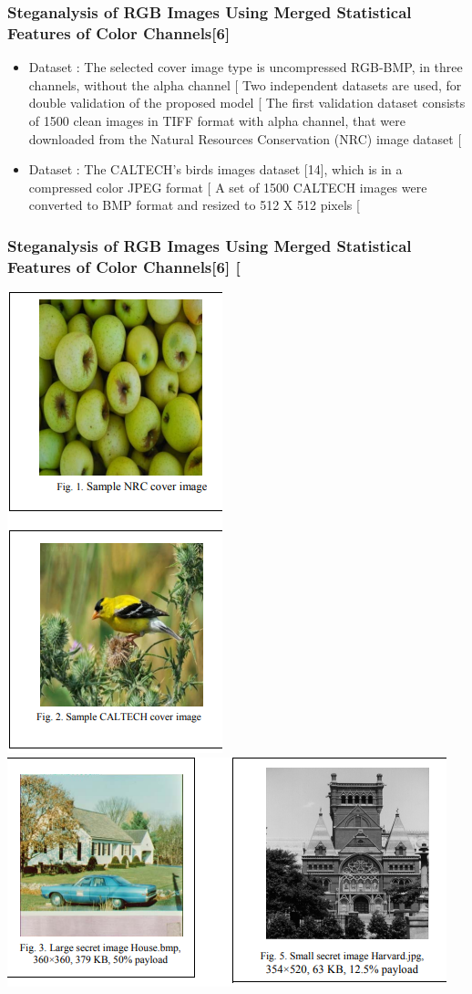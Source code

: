 \documentclass{beamer} %
\theoremstyle{definition} %
\begin{document}
\begin{frame}
\frametitle{Steganalysis of RGB Images Using Merged Statistical Features of Color Channels[6]  }
\begin{itemize}
	\item Dataset :  The selected cover image type is uncompressed RGB-BMP, in three channels, without the alpha channel [  Two independent datasets are used, for double validation of the proposed model [  The first validation dataset consists of 1500 clean images in TIFF format with alpha channel, that were downloaded from the Natural Resources Conservation (NRC) image dataset [ 
	\item Dataset : The CALTECH’s birds images dataset [14], which is in a compressed color JPEG format [  A set of 1500 CALTECH images were converted to BMP format and resized to 512 X 512 pixels [  
\end{itemize}
\end{frame}
\begin{frame}
\frametitle{Steganalysis of RGB Images Using Merged Statistical Features of Color Channels[6] [ }
\includegraphics[scale=0.35]{nrcndcaltech.png}
\includegraphics[scale=0.35]{stegImage.png}
\end{frame}
\end{document}
